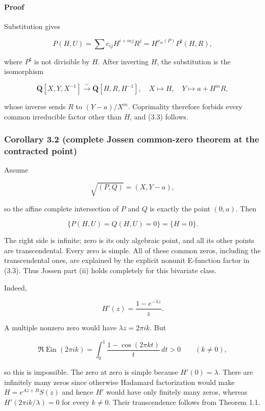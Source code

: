 \paragraph{Proof}

Substitution gives

\[
  P(H,U)=\sum c_{ij}H^{i+mj}R^j
         =H^{\nu_m(P)}P^\sharp(H,R),
\]

where \(P^\sharp\) is not divisible by \(H\). After inverting \(H\), the
substitution is the isomorphism

\[
 \overline{\mathbf Q}[X,Y,X^{-1}]
 \xrightarrow{\sim}
 \overline{\mathbf Q}[H,R,H^{-1}],
 \quad X\mapsto H,\quad Y\mapsto a+H^mR,
\]

whose inverse sends \(R\) to \((Y-a)/X^m\). Coprimality therefore forbids
every common irreducible factor other than \(H\), and (3.3) follows.

\subsubsection{Corollary 3.2 (complete Jossen common-zero theorem at the contracted point)}

Assume

\[
  \sqrt{(P,Q)}=(X,Y-a),                                      \tag{J-3.4}
\]

so the affine complete intersection of \(P\) and \(Q\) is exactly the point
\((0,a)\). Then

\[
 \{P(H,U)=Q(H,U)=0\}=\{H=0\}.                               \tag{J-3.5}
\]

The right side is infinite; zero is its only algebraic point, and all its
other points are transcendental. Every zero is simple. All of these common
zeros, including the transcendental ones, are explained by the explicit
nonunit E-function factor in (3.3). Thus Jossen part (ii) holds completely
for this bivariate class.

Indeed,

\[
 H'(z)=\frac{1-e^{-\lambda z}}z.
\]

A multiple nonzero zero would have \(\lambda z=2\pi ik\). But

\[
 \Re\operatorname{Ein}(2\pi ik)
 =\int_0^1\frac{1-\cos(2\pi kt)}t\,dt>0\qquad(k\ne0),         \tag{J-3.6}
\]

so this is impossible. The zero at zero is simple because \(H'(0)=\lambda\).
There are infinitely many zeros since otherwise Hadamard factorization would
make \(H=e^{Az+B}S(z)\) and hence \(H'\) would have only finitely many zeros,
whereas \(H'(2\pi ik/\lambda)=0\) for every \(k\ne0\). Their transcendence
follows from Theorem 1.1.

